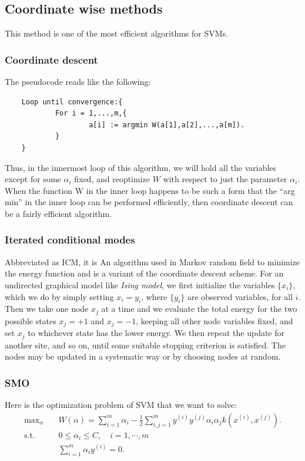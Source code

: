 \documentclass[a4paper]{book}
\begin{document}
\subsection{Coordinate wise methods}
This method is one of the most efficient algorithms for SVMs.
\subsubsection{Coordinate descent}
The pseudocode reads like the following:
\begin{verbatim}
    Loop until convergence:{
	        For i = 1,...,m,{
		            a[i] := argmin W(a[1],a[2],...,a[m]).
    	    }
    }
\end{verbatim}
Thus, in the innermost loop of this algorithm, we will hold all the variables except for some $\alpha_i$ fixed, and reoptimize $W$ with respect to just the parameter $\alpha_i$. When the function W in the inner loop happens to be such a form that the ``arg min'' in the inner loop can be performed efficiently, then coordinate descent can be a fairly efficient algorithm.
\subsubsection{Iterated conditional modes}
Abbreviated as ICM, it is An algorithm used in Markov random field to minimize the energy function and is a variant of the coordinate descent scheme. For an undirected graphical model like \emph{Ising model}, we first initialize the variables $\{x_i\}$, which we do by simply setting $x_i = y_i$, where $\{y_i\}$ are observed variables, for all $i$. Then we take one node $x_j$ at a time and we evaluate the total energy for the two possible states $x_j = + 1$ and $x_j = -1$, keeping all other node variables fixed, and set $x_j$ to whichever state has the lower energy. We then repeat the update for another site, and so on, until some suitable stopping criterion is satisfied. The nodes may be updated in a systematic way or by choosing nodes at random.
\subsubsection{SMO}\label{SMO}
Here is the optimization problem of SVM that we want to solve:
\begin{align}
\text{max}_{\alpha} &\quad W(\alpha) = \sum_{i=1}^{m} \alpha_i - \frac{1}{2} \sum_{i,j=1}^{m} y^{(i)}y^{(j)}\alpha_i \alpha_j k(x^{(i)},x^{(j)}).\\
\text{s.t.} &\quad 0 \leq \alpha_i \leq C, \quad i=1,\cdots,m  \label{SMOb}\\
&\quad \sum_{i=1}^{m} \alpha_i y^{(i)} = 0. \label{SMOc}
\end{align}
\end{document}
